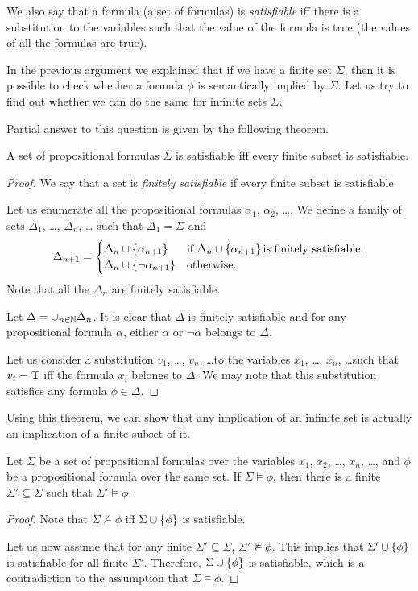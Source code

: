 We also say that a formula (a set of formulas) is \emph{satisfiable} iff there
is a substitution to the variables such that the value of the formula is true
(the values of all the formulas are true).

In the previous argument we explained that if we have a finite set $\Sigma$,
then it is possible to check whether a formula $\phi$ is semantically implied
by $\Sigma$. Let us try to find out whether we can do the same for infinite
sets $\Sigma$.

Partial answer to this question is given by the following theorem.
\begin{theorem}
  A set of propositional formulas $\Sigma$ is satisfiable iff every finite
  subset is satisfiable.
\end{theorem}
\begin{proof}
  We say that a set is \emph{finitely satisfiable} if every finite subset
  is satisfiable.


  Let us enumerate all the propositional formulas $\alpha_1$, $\alpha_2$, \dots.
  We define a family of sets $\Delta_1$, \dots, $\Delta_n$, \dots
  such that $\Delta_1 = \Sigma$ and
  \[
    \Delta_{n + 1} =
    \begin{cases}
      \Delta_n \cup \set{\alpha_{n + 1}} & \text{if }
        \Delta_n \cup \set{\alpha_{n + 1}} \text{is finitely satisfiable,} \\
      \Delta_n \cup \set{\lnot \alpha_{n + 1}} & \text{otherwise.}
    \end{cases}
  \]
  Note that all the $\Delta_n$ are finitely satisfiable.

  Let $\Delta = \cup_{n \in \mathbb{N}} \Delta_n$. It is clear that $\Delta$ is
  finitely satisfiable and for any propositional formula $\alpha$,
  either $\alpha$ or $\lnot \alpha$ belongs to $\Delta$.

  Let us consider a substitution $v_1$, \dots, $v_n$, \dots to the variables
  $x_1$, \dots, $x_n$, \dots such that $v_i = \text{T}$ iff the formula $x_i$
  belongs to $\Delta$. We may note that this substitution satisfies any
  formula $\phi \in \Delta$.
\end{proof}

Using this theorem, we can show that any implication of an infinite set is
actually an implication of a finite subset of it.
\begin{corollary}
  Let $\Sigma$ be a set of propositional formulas over the variables
  $x_1$, $x_2$, \dots, $x_n$, \dots, and $\phi$ be a propositional formula
  over the same set. If $\Sigma \models \phi$, then there is a finite
  $\Sigma' \subseteq \Sigma$ such that $\Sigma' \models \phi$.
\end{corollary}
\begin{proof}
  Note that $\Sigma \not\models \phi$ iff $\Sigma \cup \set{\phi}$ is
  satisfiable.

  Let us now assume that for any finite $\Sigma' \subseteq \Sigma$,
  $\Sigma' \not\models \phi$. This implies that $\Sigma' \cup \set{\phi}$
  is satisfiable for all finite $\Sigma'$. Therefore, $\Sigma \cup \set{\phi}$
  is satisfiable, which is a contradiction to the assumption that
  $\Sigma \models \phi$.
\end{proof}

